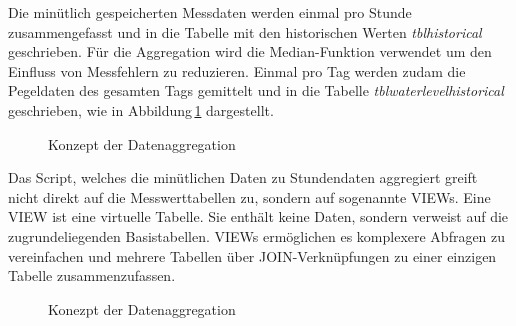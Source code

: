 
\noindent
Die minütlich gespeicherten Messdaten werden einmal pro Stunde zusammengefasst und in die Tabelle mit den historischen Werten \emph{tblhistorical} geschrieben. Für die Aggregation wird die Median-Funktion verwendet um den Einfluss von Messfehlern zu reduzieren. Einmal pro Tag werden zudam die Pegeldaten des gesamten Tags gemittelt und in die Tabelle \emph{tblwaterlevelhistorical} geschrieben, wie in Abbildung\,\ref{img:historical} dargestellt.

\begin{figure}[htbp!]
	\centering
	\caption{Konzept der Datenaggregation}
	\label{img:historical}
\end{figure}


Das Script, welches die minütlichen Daten zu Stundendaten aggregiert greift nicht direkt auf die Messwerttabellen zu, sondern auf sogenannte VIEWs. Eine VIEW ist eine virtuelle Tabelle. Sie enthält keine Daten, sondern verweist auf die zugrundeliegenden Basistabellen. VIEWs ermöglichen es komplexere Abfragen zu vereinfachen und mehrere Tabellen über JOIN-Verknüpfungen zu einer einzigen Tabelle zusammenzufassen.

\begin{figure}[htbp!]
	\centering
	\caption{Konezpt der Datenaggregation}
	\label{img:leftjoin}
\end{figure}



